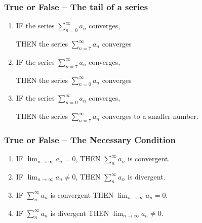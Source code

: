 \documentclass[14pt]{beamer}
\begin{document}
\begin{frame}[t]
	\fontsize{12}{12}\selectfont
	\frametitle{True or False -- The tail of a series}

	\begin{enumerate}
		\item IF the series {\color{blue} $\displaystyle \sum_{n=0}^{\infty}a_{n}$} converges,

			THEN the series {\color{red} $\displaystyle \sum_{n=7}^{\infty}a_{n}$} converges
			\vspace{.2cm}

		\item IF the series {\color{red} $\displaystyle \sum_{n=7}^{\infty}a_{n}$} converges,

			THEN the series {\color{blue} $\displaystyle \sum_{n=0}^{\infty}a_{n}$} converges
			\vspace{.2cm}

		\item IF the series {\color{red} $\displaystyle \sum_{n=0}^{\infty}a_{n}$} converges,

			THEN the series {\color{blue} $\displaystyle \sum_{n=7}^{\infty}a_{n}$} converges
			to a smaller number.
	\end{enumerate}
\end{frame}

\begin{frame}[t]
	\frametitle{True or False -- The Necessary Condition}

	\begin{enumerate}
		\item IF $\displaystyle \lim_{n \to \infty}a_{n}= 0$, \quad THEN
			$\displaystyle \sum_{n}^{\infty}a_{n}$ is convergent.
			\vfill

		\item IF $\displaystyle \lim_{n \to \infty}a_{n}\neq 0$, \quad THEN
			$\displaystyle \sum_{n}^{\infty}a_{n}$ is divergent.
			\vfill

		\item IF $\displaystyle \sum_{n}^{\infty}a_{n}$ is convergent \quad THEN $\displaystyle
			\lim_{n \to \infty}a_{n}= 0$.
			\vfill

		\item IF $\displaystyle \sum_{n}^{\infty}a_{n}$ is divergent \quad THEN $\displaystyle
			\lim_{n \to \infty}a_{n}\neq 0$.
			\vfill
	\end{enumerate}
\end{frame}
\end{document}
